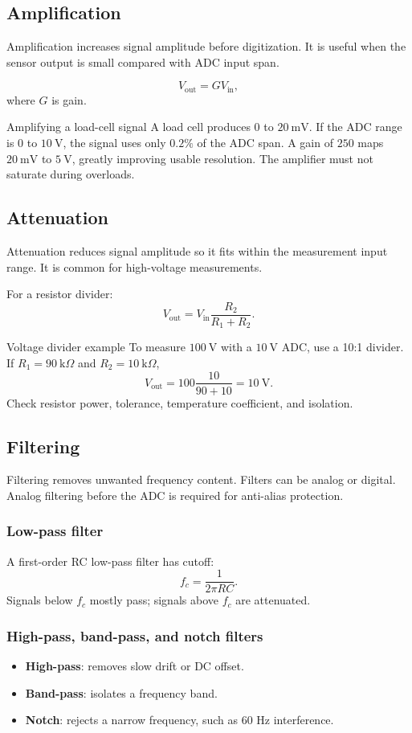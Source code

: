 \documentclass[11pt]{article}
\newcommand{\mV}{\mathrm{mV}}
\newcommand{\V}{\mathrm{V}}
\begin{document}
\subsection{Amplification}
Amplification increases signal amplitude before digitization. It is useful when
the sensor output is small compared with ADC input span.

\[
V_{\mathrm{out}} = G V_{\mathrm{in}},
\]
where \(G\) is gain.

\begin{examplebox}{Amplifying a load-cell signal}
A load cell produces \(0\) to \(20~\mV\). If the ADC range is \(0\) to \(10~\V\),
the signal uses only \(0.2\%\) of the ADC span. A gain of \(250\) maps
\(20~\mV\) to \(5~\V\), greatly improving usable resolution. The amplifier must
not saturate during overloads.
\end{examplebox}

\subsection{Attenuation}
Attenuation reduces signal amplitude so it fits within the measurement input
range. It is common for high-voltage measurements.

For a resistor divider:
\[
V_{\mathrm{out}} = V_{\mathrm{in}}\frac{R_2}{R_1+R_2}.
\]

\begin{examplebox}{Voltage divider example}
To measure \(100~\V\) with a \(10~\V\) ADC, use a 10:1 divider. If
\(R_1=90~\mathrm{k}\Omega\) and \(R_2=10~\mathrm{k}\Omega\),
\[
V_{\mathrm{out}}=100\frac{10}{90+10}=10~\V.
\]
Check resistor power, tolerance, temperature coefficient, and isolation.
\end{examplebox}

\subsection{Filtering}
Filtering removes unwanted frequency content. Filters can be analog or digital.
Analog filtering before the ADC is required for anti-alias protection.

\subsubsection{Low-pass filter}
A first-order RC low-pass filter has cutoff:
\[
f_c = \frac{1}{2\pi RC}.
\]
Signals below \(f_c\) mostly pass; signals above \(f_c\) are attenuated.

\subsubsection{High-pass, band-pass, and notch filters}
\begin{itemize}
  \item \textbf{High-pass}: removes slow drift or DC offset.
  \item \textbf{Band-pass}: isolates a frequency band.
  \item \textbf{Notch}: rejects a narrow frequency, such as 60 Hz interference.
\end{itemize}
\end{document}
